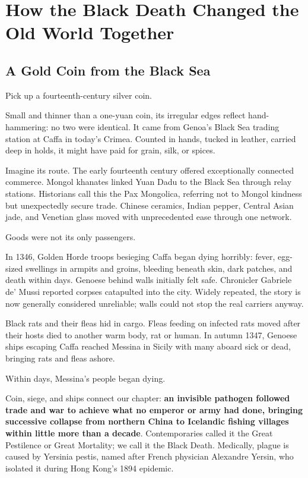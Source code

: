 \chapter[The Black Death and the Old World]{How the Black Death Changed the Old World Together}
\section{A Gold Coin from the Black Sea}
Pick up a fourteenth-century silver coin.

Small and thinner than a one-yuan coin, its irregular edges reflect hand-hammering: no two were identical. It came from Genoa's Black Sea trading station at Caffa in today's Crimea. Counted in hands, tucked in leather, carried deep in holds, it might have paid for grain, silk, or spices.

Imagine its route. The early fourteenth century offered exceptionally connected commerce. Mongol khanates linked Yuan Dadu to the Black Sea through relay stations. Historians call this the Pax Mongolica, referring not to Mongol kindness but unexpectedly secure trade. Chinese ceramics, Indian pepper, Central Asian jade, and Venetian glass moved with unprecedented ease through one network.

Goods were not its only passengers.

In 1346, Golden Horde troops besieging Caffa began dying horribly: fever, egg-sized swellings in armpits and groins, bleeding beneath skin, dark patches, and death within days. Genoese behind walls initially felt safe. Chronicler Gabriele de' Mussi reported corpses catapulted into the city. Widely repeated, the story is now generally considered unreliable; walls could not stop the real carriers anyway.

Black rats and their fleas hid in cargo. Fleas feeding on infected rats moved after their hosts died to another warm body, rat or human. In autumn 1347, Genoese ships escaping Caffa reached Messina in Sicily with many aboard sick or dead, bringing rats and fleas ashore.

Within days, Messina's people began dying.

Coin, siege, and ships connect our chapter: \textbf{an invisible pathogen followed trade and war to achieve what no emperor or army had done, bringing successive collapse from northern China to Icelandic fishing villages within little more than a decade}. Contemporaries called it the Great Pestilence or Great Mortality; we call it the Black Death. Medically, plague is caused by Yersinia pestis, named after French physician Alexandre Yersin, who isolated it during Hong Kong's 1894 epidemic.

